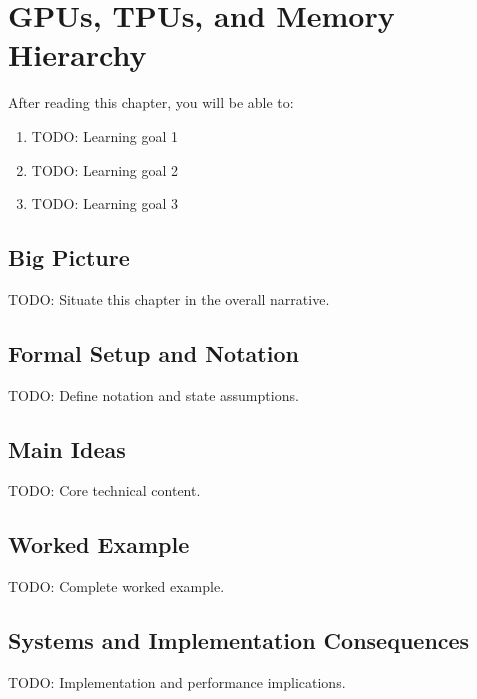 \chapter{GPUs, TPUs, and Memory Hierarchy}
\label{ch:15}

\begin{keyinsight}
After reading this chapter, you will be able to:
\begin{enumerate}
  \item TODO: Learning goal 1
  \item TODO: Learning goal 2
  \item TODO: Learning goal 3
\end{enumerate}
\end{keyinsight}

\section{Big Picture}
\label{ch:15:sec:big_picture}

TODO: Situate this chapter in the overall narrative.

\section{Formal Setup and Notation}
\label{ch:15:sec:setup}

TODO: Define notation and state assumptions.

\section{Main Ideas}
\label{ch:15:sec:main}

TODO: Core technical content.

\section{Worked Example}
\label{ch:15:sec:example}

TODO: Complete worked example.

\section{Systems and Implementation Consequences}
\label{ch:15:sec:systems}

TODO: Implementation and performance implications.

